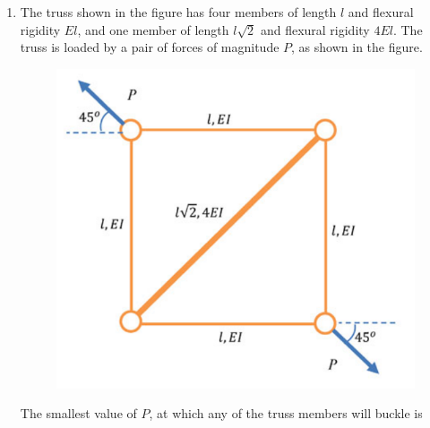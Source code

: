 \documentclass[12pt,onecolumn]{article}
\begin{document}
\begin{enumerate}
    \item The truss shown in the figure has four members of length $l$ and flexural rigidity $El$, and one member of length $l\sqrt{2}$ and flexural rigidity $4El$. The truss is loaded by a pair of forces of magnitude $P$, as shown in the figure.
          \begin{figure}[H]
              \centering
              \includegraphics[scale=0.5]{q30}
              \label{fig:q30}
          \end{figure}
          The smallest value of $P$, at which any of the truss members will buckle is
          \begin{enumerate}
          \end{enumerate}


\end{enumerate}
\end{document}
